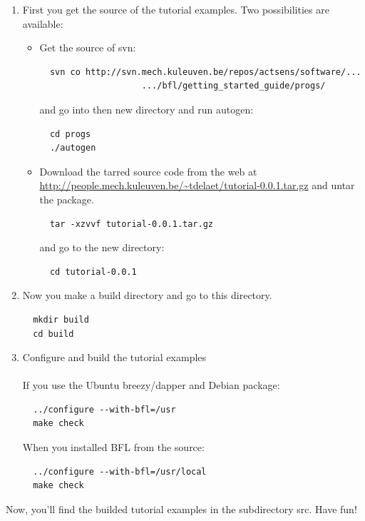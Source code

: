 \documentclass[a4paper,10pt]{report}
\begin{document}
\begin{enumerate}
\item First you get the source of the tutorial examples. Two
  possibilities are available:
\begin{itemize}
\item Get the source of svn:
\begin{verbatim}
  svn co http://svn.mech.kuleuven.be/repos/actsens/software/...
                    .../bfl/getting_started_guide/progs/
\end{verbatim}
and go into then new directory and run autogen:
\begin{verbatim}
  cd progs
  ./autogen
\end{verbatim}
\item Download the tarred source code from the web at\\
  \url{http://people.mech.kuleuven.be/~tdelaet/tutorial-0.0.1.tar.gz}
  and untar the package.
\begin{verbatim}
  tar -xzvvf tutorial-0.0.1.tar.gz 
\end{verbatim}
and go to the new directory:
\begin{verbatim}
  cd tutorial-0.0.1
\end{verbatim}
\end{itemize}
\item Now you make a build directory and go to this directory.
\begin{verbatim}
  mkdir build
  cd build
\end{verbatim}
\item Configure and build the tutorial examples\\ \\
  If you use the Ubuntu breezy/dapper and Debian package:
\begin{verbatim}
  ../configure --with-bfl=/usr
  make check
\end{verbatim}
When you installed BFL from the source:
\begin{verbatim}
  ../configure --with-bfl=/usr/local
  make check
\end{verbatim}
\end{enumerate}
Now, you'll find the builded tutorial examples in the subdirectory
src. Have fun!





\end{document}
